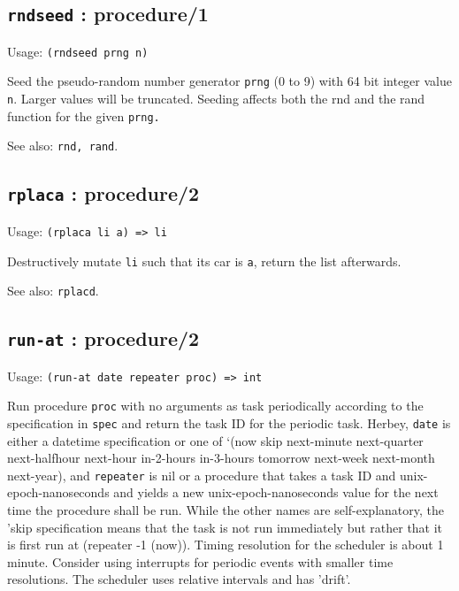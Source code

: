 \documentclass[
]{article}
\newcommand{\passthrough}[1]{#1}
\begin{document}
\hypertarget{rndseed-procedure1-1}{%
\subsection{\texorpdfstring{\texttt{rndseed} :
procedure/1}{rndseed : procedure/1}}\label{rndseed-procedure1-1}}

Usage: \passthrough{\lstinline!(rndseed prng n)!}

Seed the pseudo-random number generator \passthrough{\lstinline!prng!}
(0 to 9) with 64 bit integer value \passthrough{\lstinline!n!}. Larger
values will be truncated. Seeding affects both the rnd and the rand
function for the given \passthrough{\lstinline!prng.!}

See also: \passthrough{\lstinline!rnd, rand!}.

\hypertarget{rplaca-procedure2-1}{%
\subsection{\texorpdfstring{\texttt{rplaca} :
procedure/2}{rplaca : procedure/2}}\label{rplaca-procedure2-1}}

Usage: \passthrough{\lstinline!(rplaca li a) => li!}

Destructively mutate \passthrough{\lstinline!li!} such that its car is
\passthrough{\lstinline!a!}, return the list afterwards.

See also: \passthrough{\lstinline!rplacd!}.

\hypertarget{run-at-procedure2-1}{%
\subsection{\texorpdfstring{\texttt{run-at} :
procedure/2}{run-at : procedure/2}}\label{run-at-procedure2-1}}

Usage: \passthrough{\lstinline!(run-at date repeater proc) => int!}

Run procedure \passthrough{\lstinline!proc!} with no arguments as task
periodically according to the specification in
\passthrough{\lstinline!spec!} and return the task ID for the periodic
task. Herbey, \passthrough{\lstinline!date!} is either a datetime
specification or one of `(now skip next-minute next-quarter
next-halfhour next-hour in-2-hours in-3-hours tomorrow next-week
next-month next-year), and \passthrough{\lstinline!repeater!} is nil or
a procedure that takes a task ID and unix-epoch-nanoseconds and yields a
new unix-epoch-nanoseconds value for the next time the procedure shall
be run. While the other names are self-explanatory, the 'skip
specification means that the task is not run immediately but rather that
it is first run at (repeater -1 (now)). Timing resolution for the
scheduler is about 1 minute. Consider using interrupts for periodic
events with smaller time resolutions. The scheduler uses relative
intervals and has 'drift'.
\end{document}
